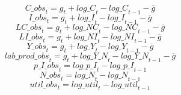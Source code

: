 \begin{dmath}
{C\_obs}_{t}={{g}}_{t}+{log\_C}_{t}-{log\_C}_{t-1}-{{\overline{g}}}
\end{dmath}
\begin{dmath}
{I\_obs}_{t}={{g}}_{t}+{log\_I}_{t}-{log\_I}_{t-1}-{{\overline{g}}}
\end{dmath}
\begin{dmath}
{LC\_obs}_{t}={{g}}_{t}+{log\_NC}_{t}-{log\_NC}_{t-1}-{{\overline{g}}}
\end{dmath}
\begin{dmath}
{LI\_obs}_{t}={{g}}_{t}+{log\_NI}_{t}-{log\_NI}_{t-1}-{{\overline{g}}}
\end{dmath}
\begin{dmath}
{Y\_obs}_{t}={{g}}_{t}+{log\_Y}_{t}-{log\_Y}_{t-1}-{{\overline{g}}}
\end{dmath}
\begin{dmath}
{lab\_prod\_obs}_{t}={{g}}_{t}+{log\_Y\_N}_{t}-{log\_Y\_N}_{t-1}-{{\overline{g}}}
\end{dmath}
\begin{dmath}
{p\_I\_obs}_{t}={log\_p\_I}_{t}-{log\_p\_I}_{t-1}
\end{dmath}
\begin{dmath}
{N\_obs}_{t}={log\_N}_{t}-{log\_N}_{t-1}
\end{dmath}
\begin{dmath}
{util\_obs}_{t}={log\_util}_{t}-{log\_util}_{t-1}
\end{dmath}
